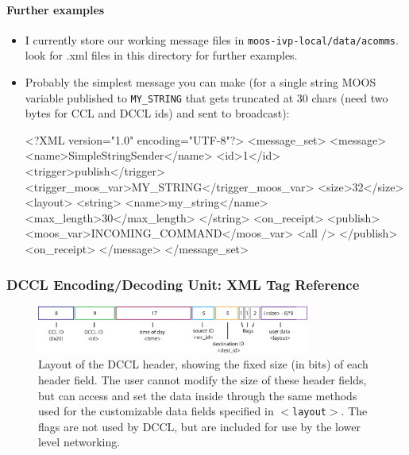 \documentclass[11pt, letterpaper, oneside]{memoir}
\newcommand{\xmltag}[1]{\texttt{$<$#1$>$}}
\begin{document}
\begin{itemize}
\paragraph{Further examples} \label{sec:ex}
\begin{itemize}
\item I currently store our working message files in \verb|moos-ivp-local/data/acomms|. look for .xml files in this directory for further examples.
\item Probably the simplest message you can make (for a single string MOOS variable published to \verb|MY_STRING| that gets truncated at 30 chars (need two bytes for CCL and DCCL ids) and sent to broadcast):
\begin{small}
\begin{boxedverbatim}
<?XML version="1.0" encoding="UTF-8"?>
<message_set>
  <message>
    <name>SimpleStringSender</name>
    <id>1</id>    
    <trigger>publish</trigger>
    <trigger_moos_var>MY_STRING</trigger_moos_var>
    <size>32</size>
    <layout>
      <string>
        <name>my_string</name>
        <max_length>30</max_length>
      </string>
    <on_receipt>
      <publish>
        <moos_var>INCOMING_COMMAND</moos_var>
        <all />
      </publish>
    <on_receipt>
  </message>
</message_set>
\end{boxedverbatim}
\resetbvlinenumber
\end{small}
\end{itemize}


\subsubsection{DCCL Encoding/Decoding Unit: XML Tag Reference}

\begin{figure}
\centering
\includegraphics[width=0.8\textwidth]{dccl-header.eps}
\caption{Layout of the DCCL header, showing the fixed size (in bits) of each header field. The user cannot modify the size of these header fields, but can access and set the data inside through the same methods used for the customizable data fields specified in \xmltag{layout}. The flags are not used by DCCL, but are included for use by the lower level networking.}
\label{fig:header}
\end{figure}


\end{itemize}
\end{document}
